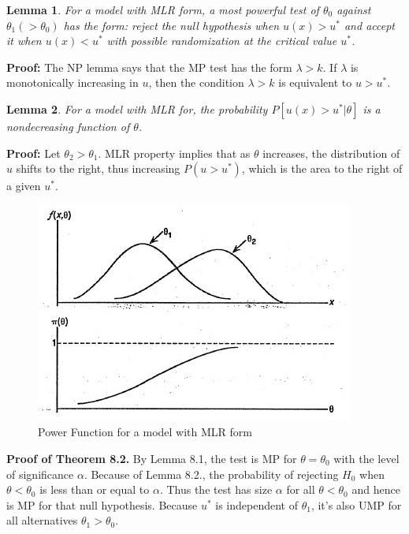 \documentclass{article}
\newtheorem{lemma}{Lemma}[section]
\begin{document}
\begin{lemma}
    For a model with MLR form, a most powerful test of \(\theta_0\) against \(\theta_1 (>\theta_0)\) has the form: reject the null hypothesis when \(u(x)>u^*\) and accept it when \(u(x)<u^*\) with possible randomization at the critical value $u^*$.
\end{lemma} 

\textbf{Proof:} The NP lemma says that the MP test has the form \(\lambda>k\). If \(\lambda\) is monotonically increasing in \(u\), then the condition \(\lambda>k\) is equivalent to \(u>u^*\).


\begin{lemma}
    For a model with MLR for, the probability \(P[u(x)>u^*|\theta]\) is a nondecreasing function of \(\theta\).    
\end{lemma}

\textbf{Proof:}
Let \(\theta_2>\theta_1\). MLR property implies that as \(\theta\) increases, the distribution of \(u\) shifts to the right, thus increasing \(P(u>u^*)\), which is the area to the right of a given \(u^*\).

\begin{figure} [H]
    \centering
    \includegraphics{pics/power function.jpg}
    \caption{Power Function for a model with MLR form}
    \label{fig:enter-label999}
\end{figure}

\textbf{Proof of Theorem 8.2.} By Lemma 8.1, the test is MP for \(\theta=\theta_0\) with the level of significance \(\alpha\). Because of Lemma 8.2., the probability of rejecting \(H_0\) when \(\theta<\theta_0\) is less than or equal to \(\alpha\). Thus the test has size \(\alpha\) for all \(\theta<\theta_0\) and hence is MP for that null hypothesis. Because \(u^*\) is independent of \(\theta_1\), it's also UMP for all alternatives \(\theta_1>\theta_0\).
\end{document}
